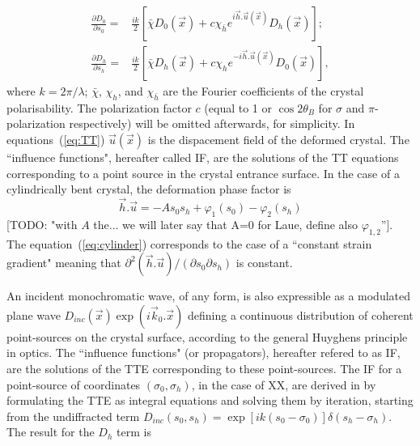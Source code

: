 \documentclass[preprint]{iucr}              %
\newcommand{\todo}[1]{{\color{red}[TODO: "#1'']}}
\newcommand{\inblue}[1]{{\color{blue}#1}}
\newcommand{\inred}[1]{{\color{red}#1}}
\begin{document}
\begin{equation}
\label{eq:TT}
\begin{aligned}
\frac{\partial D_0}{\partial s_0} =& \frac{ik}{2} \left[ \bar{\chi} D_0(\vec x)+c \chi_{\bar h} e^{i \vec h . \vec u (\vec x)} D_h(\vec x) \right]; \\
\frac{\partial D_h}{\partial s_h} =& \frac{ik}{2} \left[ \bar{\chi} D_h(\vec x)+c \chi_{h} e^{-i \vec h . \vec u (\vec x)} D_0(\vec x) \right],
\end{aligned}
\end{equation}
where $k=2\pi/\lambda$; $\bar \chi$, $\chi_h$, and $\chi_{\bar h}$ are the Fourier coefficients of the crystal polarisability. The \inblue{polarization} factor $c$ (equal to 1 or $\cos2\theta_B$ for $\sigma$ and $\pi$-polarization respectively) will be omitted afterwards, for simplicity. 
In equations~(\ref{eq:TT}) $\vec u (\vec x)$ is the dispacement field of the deformed crystal. The ``influence functions", hereafter called IF, are the solutions of the TT equations corresponding to a point source in the crystal entrance surface. In the case of a cylindrically bent crystal, the deformation phase factor is
\begin{equation}
\label{eq:cylinder}
    \vec h . \vec u = -A s_0 s_h + \varphi_1(s_0) - \varphi_2(s_h)
\end{equation}
\todo{with $A$ the... we will later say that A=0 for Laue,  define also $\varphi_{1,2}$}.
The equation~(\ref{eq:cylinder}) corresponds to the case of a ``constant strain gradient" \cite{authierbook} meaning that $\partial^2(\vec h . \vec u)/(\partial s_0 \partial s_h)$ is constant.


An incident monochromatic wave, of any form, is also expressible as a modulated plane wave $D_{inc}(\vec x)\exp(i\vec k_0. \vec x)$ defining a continuous distribution of coherent point-sources on the crystal surface, according to the general Huyghens principle in optics. The ``influence functions" (or propagators), hereafter refered to as IF, are the solutions of the TTE corresponding to these point-sources. The IF for a point-source of coordinates $(\sigma_0,\sigma_h)$, in the case of \inred{XX}, are derived in \cite{GuigayFerrero2016} by formulating the TTE as integral equations and solving them by iteration, starting from the undiffracted term $D_{inc}(s_0,s_h)=\exp[ik(s_0-\sigma_0)]\delta(s_h-\sigma_h)$. The result for the $D_h$ term is   
\end{document}
